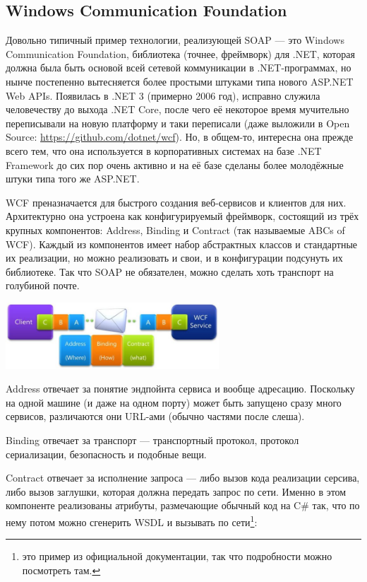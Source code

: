 \documentclass{../../text-style}
\begin{document}
\subsection{Windows Communication Foundation}

Довольно типичный пример технологии, реализующей SOAP --- это Windows Communication Foundation, библиотека (точнее, фреймворк) для .NET, которая должна была быть основой всей сетевой коммуникации в .NET-программах, но нынче постепенно вытесняется более простыми штуками типа нового ASP.NET Web APIs. Появилась в .NET 3 (примерно 2006 год), исправно служила человечеству до выхода .NET Core, после чего её некоторое время мучительно переписывали на новую платформу и таки переписали (даже выложили в Open Source: \url{https://github.com/dotnet/wcf}). Но, в общем-то, интересна она прежде всего тем, что она используется в корпоративных системах на базе .NET Framework до сих пор очень активно и на её базе сделаны более молодёжные штуки типа того же ASP.NET.

WCF преназначается для быстрого создания веб-сервисов и клиентов для них. Архитектурно она устроена как конфигурируемый фреймворк, состоящий из трёх крупных компонентов: Address, Binding и Contract (так называемые ABCs of WCF). Каждый из компонентов имеет набор абстрактных классов и стандартные их реализации, но можно реализовать и свои, и в конфигурации подсунуть их библиотеке. Так что SOAP не обязателен, можно сделать хоть транспорт на голубиной почте.

\begin{center}
    \includegraphics[width=0.6\textwidth]{wcf.png}
\end{center}

Address отвечает за понятие эндпойнта сервиса и вообще адресацию. Поскольку на одной машине (и даже на одном порту) может быть запущено сразу много сервисов, различаются они URL-ами (обычно частями после слеша).

Binding отвечает за транспорт --- транспортный протокол, протокол сериализации, безопасность и подобные вещи.

Contract отвечает за исполнение запроса --- либо вызов кода реализации серсива, либо вызов заглушки, которая должна передать запрос по сети. Именно в этом компоненте реализованы атрибуты, размечающие обычный код на C\# так, что по нему потом можно сгенерить WSDL и вызывать по сети\footnote{это пример из официальной документации, так что подробности можно посмотреть там.}: 
\end{document}
